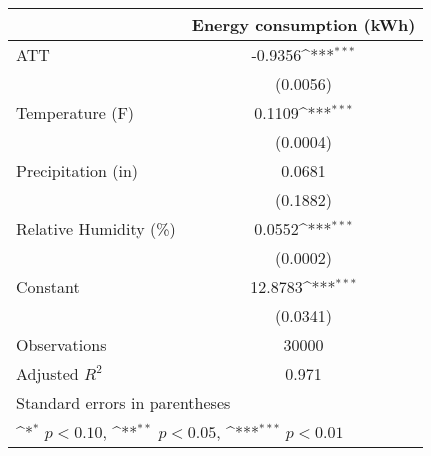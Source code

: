 {
\def\sym#1{\ifmmode^{#1}\else\(^{#1}\)\fi}
\begin{tabular}{l*{1}{c}}
\hline\hline
                    &\multicolumn{1}{c}{Energy consumption (kWh)}\\
\hline
ATT                 &     -0.9356\sym{***}\\
                    &    (0.0056)         \\
[1em]
Temperature (F)     &      0.1109\sym{***}\\
                    &    (0.0004)         \\
[1em]
Precipitation (in)  &      0.0681         \\
                    &    (0.1882)         \\
[1em]
Relative Humidity (\%)&      0.0552\sym{***}\\
                    &    (0.0002)         \\
[1em]
Constant            &     12.8783\sym{***}\\
                    &    (0.0341)         \\
\hline
Observations        &       30000         \\
Adjusted \(R^{2}\)  &       0.971         \\
\hline\hline
\multicolumn{2}{l}{\footnotesize Standard errors in parentheses}\\
\multicolumn{2}{l}{\footnotesize \sym{*} \(p<0.10\), \sym{**} \(p<0.05\), \sym{***} \(p<0.01\)}\\
\end{tabular}
}
